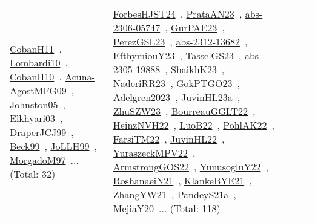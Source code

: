 {\begin{longtable}{lp{3cm}>{\raggedright\arraybackslash}p{6cm}>{\raggedright\arraybackslash}p{6cm}>{\raggedright\arraybackslash}p{8cm}}
\href{../works/CobanH11.pdf}{CobanH11}~\cite{CobanH11}, \href{../works/Lombardi10.pdf}{Lombardi10}~\cite{Lombardi10}, \href{../works/CobanH10.pdf}{CobanH10}~\cite{CobanH10}, \href{../works/Acuna-AgostMFG09.pdf}{Acuna-AgostMFG09}~\cite{Acuna-AgostMFG09}, \href{../works/Johnston05.pdf}{Johnston05}~\cite{Johnston05}, \href{../works/Elkhyari03.pdf}{Elkhyari03}~\cite{Elkhyari03}, \href{../works/DraperJCJ99.pdf}{DraperJCJ99}~\cite{DraperJCJ99}, \href{../works/Beck99.pdf}{Beck99}~\cite{Beck99}, \href{../works/JoLLH99.pdf}{JoLLH99}~\cite{JoLLH99}, \href{../works/MorgadoM97.pdf}{MorgadoM97}~\cite{MorgadoM97}... (Total: 32) & \href{../works/ForbesHJST24.pdf}{ForbesHJST24}~\cite{ForbesHJST24}, \href{../works/PrataAN23.pdf}{PrataAN23}~\cite{PrataAN23}, \href{../works/abs-2306-05747.pdf}{abs-2306-05747}~\cite{abs-2306-05747}, \href{../works/GurPAE23.pdf}{GurPAE23}~\cite{GurPAE23}, \href{../works/PerezGSL23.pdf}{PerezGSL23}~\cite{PerezGSL23}, \href{../works/abs-2312-13682.pdf}{abs-2312-13682}~\cite{abs-2312-13682}, \href{../works/EfthymiouY23.pdf}{EfthymiouY23}~\cite{EfthymiouY23}, \href{../works/TasselGS23.pdf}{TasselGS23}~\cite{TasselGS23}, \href{../works/abs-2305-19888.pdf}{abs-2305-19888}~\cite{abs-2305-19888}, \href{../works/ShaikhK23.pdf}{ShaikhK23}~\cite{ShaikhK23}, \href{../works/NaderiRR23.pdf}{NaderiRR23}~\cite{NaderiRR23}, \href{../works/GokPTGO23.pdf}{GokPTGO23}~\cite{GokPTGO23}, \href{../works/Adelgren2023.pdf}{Adelgren2023}~\cite{Adelgren2023}, \href{../works/JuvinHL23a.pdf}{JuvinHL23a}~\cite{JuvinHL23a}, \href{../works/ZhuSZW23.pdf}{ZhuSZW23}~\cite{ZhuSZW23}, \href{../works/BourreauGGLT22.pdf}{BourreauGGLT22}~\cite{BourreauGGLT22}, \href{../works/HeinzNVH22.pdf}{HeinzNVH22}~\cite{HeinzNVH22}, \href{../works/LuoB22.pdf}{LuoB22}~\cite{LuoB22}, \href{../works/PohlAK22.pdf}{PohlAK22}~\cite{PohlAK22}, \href{../works/FarsiTM22.pdf}{FarsiTM22}~\cite{FarsiTM22}, \href{../works/JuvinHL22.pdf}{JuvinHL22}~\cite{JuvinHL22}, \href{../works/YuraszeckMPV22.pdf}{YuraszeckMPV22}~\cite{YuraszeckMPV22}, \href{../works/ArmstrongGOS22.pdf}{ArmstrongGOS22}~\cite{ArmstrongGOS22}, \href{../works/YunusogluY22.pdf}{YunusogluY22}~\cite{YunusogluY22}, \href{../works/RoshanaeiN21.pdf}{RoshanaeiN21}~\cite{RoshanaeiN21}, \href{../works/KlankeBYE21.pdf}{KlankeBYE21}~\cite{KlankeBYE21}, \href{../works/ZhangYW21.pdf}{ZhangYW21}~\cite{ZhangYW21}, \href{../works/PandeyS21a.pdf}{PandeyS21a}~\cite{PandeyS21a}, \href{../works/MejiaY20.pdf}{MejiaY20}~\cite{MejiaY20}... (Total: 118)\\

\end{longtable}}
